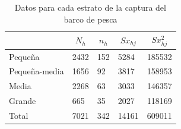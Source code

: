 \documentclass{report}
\begin{document}
\bigbreak


\begin{table}[H]
\centering
\begin{tabular}{|l|l|l|l|l|}
\hline
\rowcolor[HTML]{CBCEFB} 
\multicolumn{1}{|c|}{\cellcolor[HTML]{CBCEFB}\textbf{Categoría}} & \multicolumn{1}{c|}{\cellcolor[HTML]{CBCEFB}\textbf{$N_h$}} & \multicolumn{1}{c|}{\cellcolor[HTML]{CBCEFB}\textbf{$n_h$}} & \multicolumn{1}{c|}{\cellcolor[HTML]{CBCEFB}\textbf{$Sx_{hj}$}} & \multicolumn{1}{c|}{\cellcolor[HTML]{CBCEFB}\textbf{$Sx_{hj}^2$}} \\ \hline
Pequeña                                                          & 2432                                                        & 152                                                         & 5284                                                            & 185532                                                            \\ \hline
\rowcolor[HTML]{EFEFEF} 
Pequeña-media                                                    & 1656                                                        & 92                                                          & 3817                                                            & 158953                                                            \\ \hline
Media                                                            & 2268                                                        & 63                                                          & 3033                                                            & 146357                                                            \\ \hline
\rowcolor[HTML]{EFEFEF} 
Grande                                                           & 665                                                         & 35                                                          & 2027                                                            & 118169                                                            \\ \hline
\rowcolor[HTML]{FFCE93} 
Total                                                            & 7021                                                        & 342                                                         & 14161                                                           & 609011                                                            \\ \hline
\end{tabular}
\caption{Datos para cada estrato de la captura del barco de pesca}
\end{table}
\end{document}
